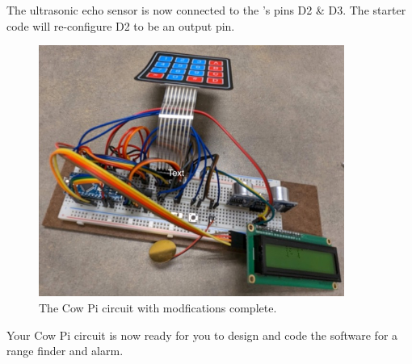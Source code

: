 The ultrasonic echo sensor is now connected to the \developmentboard's pins D2 \& D3.
The starter code will re-configure D2 to be an output pin.

\begin{figure}
    \centering
    \includegraphics[width=10cm]{reconfiguration_images/complete}
    \caption{The Cow Pi circuit with modfications complete.}
\end{figure}

\vspace{1cm}

Your Cow Pi circuit is now ready for you to design and code the software for a range finder and alarm.
